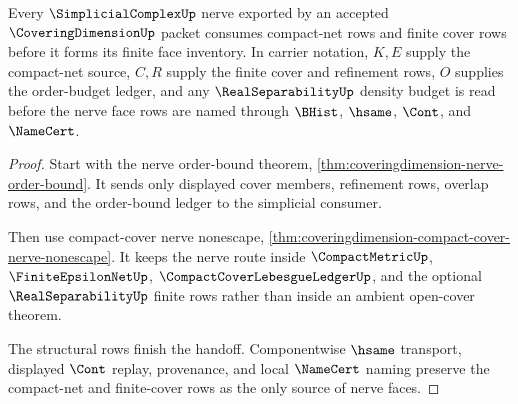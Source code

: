 \begin{theorem}
\label{thm:coveringdimension-compact-net-simplicial-nerve}
Every $\SimplicialComplexUp$ nerve exported by an accepted $\CoveringDimensionUp$ packet consumes compact-net rows and finite cover rows before it forms its finite face inventory. In carrier notation, $K,E$ supply the compact-net source, $C,R$ supply the finite cover and refinement rows, $O$ supplies the order-budget ledger, and any $\RealSeparabilityUp$ density budget is read before the nerve face rows are named through $\BHist$, $\hsame$, $\Cont$, and $\NameCert$.
\end{theorem}
\begin{proof}
Start with the nerve order-bound theorem, \autoref{thm:coveringdimension-nerve-order-bound}. It sends only displayed cover members, refinement rows, overlap rows, and the order-bound ledger to the simplicial consumer.

Then use compact-cover nerve nonescape, \autoref{thm:coveringdimension-compact-cover-nerve-nonescape}. It keeps the nerve route inside $\CompactMetricUp$, $\FiniteEpsilonNetUp$, $\CompactCoverLebesgueLedgerUp$, and the optional $\RealSeparabilityUp$ finite rows rather than inside an ambient open-cover theorem.

The structural rows finish the handoff. Componentwise $\hsame$ transport, displayed $\Cont$ replay, provenance, and local $\NameCert$ naming preserve the compact-net and finite-cover rows as the only source of nerve faces.
\end{proof}

